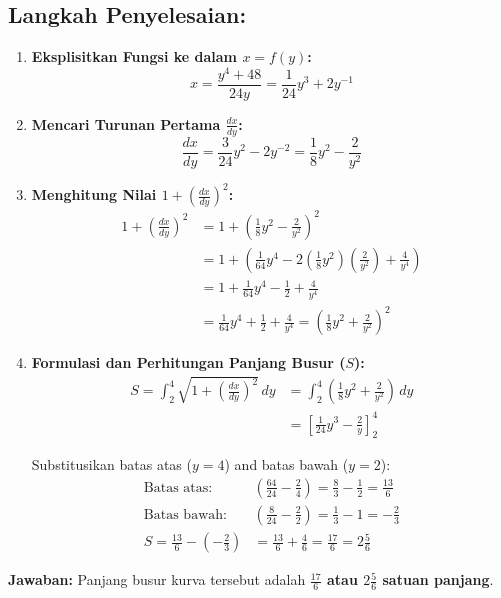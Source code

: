 \documentclass[11pt,a4paper]{article}
\begin{document}
\subsection*{Langkah Penyelesaian:}
\begin{enumerate}
  \item \textbf{Eksplisitkan Fungsi ke dalam $x = f(y)$:}
  \begin{equation*}
    x = \frac{y^4 + 48}{24y} = \frac{1}{24}y^3 + 2y^{-1}
  \end{equation*}
  
  \item \textbf{Mencari Turunan Pertama $\frac{dx}{dy}$:}
  \begin{equation*}
    \frac{dx}{dy} = \frac{3}{24}y^2 - 2y^{-2} = \frac{1}{8}y^2 - \frac{2}{y^2}
  \end{equation*}
  
  \item \textbf{Menghitung Nilai $1 + \left(\frac{dx}{dy}\right)^2$:}
  \begin{align*}
    1 + \left(\frac{dx}{dy}\right)^2 &= 1 + \left( \frac{1}{8}y^2 - \frac{2}{y^2} \right)^2 \\
    &= 1 + \left( \frac{1}{64}y^4 - 2\left(\frac{1}{8}y^2\right)\left(\frac{2}{y^2}\right) + \frac{4}{y^4} \right) \\
    &= 1 + \frac{1}{64}y^4 - \frac{1}{2} + \frac{4}{y^4} \\
    &= \frac{1}{64}y^4 + \frac{1}{2} + \frac{4}{y^4} = \left( \frac{1}{8}y^2 + \frac{2}{y^2} \right)^2
  \end{align*}
  
  \item \textbf{Formulasi dan Perhitungan Panjang Busur ($S$):}
  \begin{align*}
    S = \int_{2}^{4} \sqrt{1 + \left(\frac{dx}{dy}\right)^2} \, dy &= \int_{2}^{4} \left( \frac{1}{8}y^2 + \frac{2}{y^2} \right) \, dy \\
    &= \left[ \frac{1}{24}y^3 - \frac{2}{y} \right]_{2}^{4}
  \end{align*}
  
  Substitusikan batas atas ($y=4$) and batas bawah ($y=2$):
  \begin{align*}
    \text{Batas atas:} \quad &\left( \frac{64}{24} - \frac{2}{4} \right) = \frac{8}{3} - \frac{1}{2} = \frac{13}{6} \\
    \text{Batas bawah:} \quad &\left( \frac{8}{24} - \frac{2}{2} \right) = \frac{1}{3} - 1 = -\frac{2}{3} \\
    S = \frac{13}{6} - \left( -\frac{2}{3} \right) &= \frac{13}{6} + \frac{4}{6} = \frac{17}{6} = 2\frac{5}{6}
  \end{align*}
\end{enumerate}
\textbf{Jawaban:} Panjang busur kurva tersebut adalah \textbf{$\frac{17}{6}$ atau $2\frac{5}{6}$ satuan panjang}.
\end{document}
